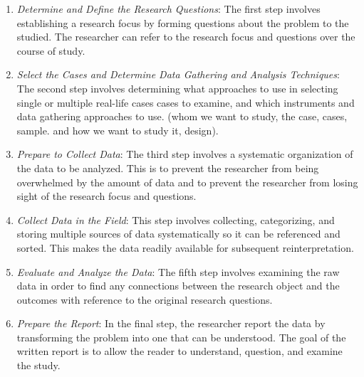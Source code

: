 \begin{enumerate}
	\item \textit{Determine and Define the Research Questions}: The first step involves establishing a research focus by forming questions about the problem to the studied. The researcher can refer to the research focus and questions over the course of study. 
	\item \textit{Select the Cases and Determine Data Gathering and Analysis Techniques}: The second step involves determining what approaches to use in selecting single or multiple real-life cases cases to examine, and which instruments and data gathering approaches to use. (whom we want to study, the case, cases, sample. and how we want to study it, design).
	\item \textit{Prepare to Collect Data}: The third step involves a systematic organization of the data to be analyzed. This is to prevent the researcher from being overwhelmed by the amount of data and to prevent the researcher from losing sight of the research focus and questions. 
	\item \textit{Collect Data in the Field}: This step involves collecting, categorizing, and storing multiple sources of data systematically so it can be referenced and sorted. This makes the data readily available for subsequent reinterpretation. 
	\item \textit{Evaluate and Analyze the Data}: The fifth step involves examining the raw data in order to find any connections between the research object and the outcomes with reference to the original research questions. 
	\item \textit{Prepare the Report}: In the final step, the researcher report the data by transforming the problem into one that can be understood. The goal of the written report is to allow the reader to understand, question, and examine the study.
\end{enumerate}

